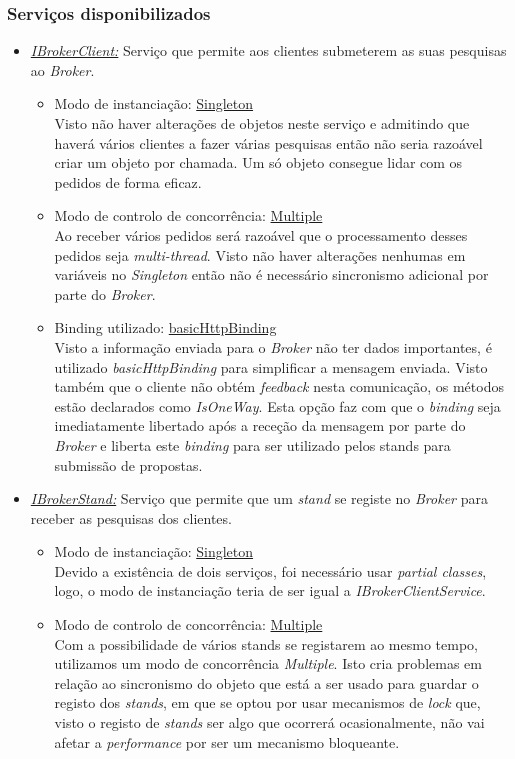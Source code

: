 \documentclass[a4paper]{article}
\begin{document}
\subsubsection{Serviços disponibilizados}
\begin{itemize} 

\item
\emph{\underline{IBrokerClient:}}
Serviço que permite aos clientes submeterem as suas pesquisas ao \emph{Broker}.
	\begin{itemize}
		\item
		Modo de instanciação: \underline{Singleton}\\
		Visto não haver alterações de objetos neste serviço e admitindo que haverá vários clientes a fazer várias pesquisas então não seria razoável criar um objeto por chamada. Um só objeto consegue lidar com os pedidos de forma eficaz.
		\item
		Modo de controlo de concorrência: \underline{Multiple}\\
		Ao receber vários pedidos será razoável que o processamento desses pedidos seja \emph{multi-thread}. Visto não haver alterações nenhumas em variáveis no \emph{Singleton} então não é necessário sincronismo adicional por parte do \emph{Broker}.
		\item
		Binding utilizado: \underline{basicHttpBinding}\\
		Visto a informação enviada para o \emph{Broker} não ter dados importantes, é utilizado \emph{basicHttpBinding} para simplificar a mensagem enviada. Visto também que o cliente não obtém \emph{feedback} nesta comunicação, os métodos estão declarados como \emph{IsOneWay}. Esta opção faz com que o \emph{binding} seja imediatamente libertado após a receção da mensagem por parte do \emph{Broker} e liberta este \emph{binding} para ser utilizado pelos stands para submissão de propostas.
	\end{itemize}
\item
\emph{\underline{IBrokerStand:}}
Serviço que permite que um \emph{stand} se registe no \emph{Broker} para receber as pesquisas dos clientes.
		\begin{itemize}
		\item
		Modo de instanciação: \underline{Singleton}\\
		Devido a existência de dois serviços, foi necessário usar \emph{partial classes}, logo, o modo de instanciação teria de ser igual a \emph{IBrokerClientService}.
		\item
		Modo de controlo de concorrência: \underline{Multiple}\\
		Com a possibilidade de vários stands se registarem ao mesmo tempo, utilizamos um modo de concorrência \emph{Multiple}. Isto cria problemas em relação ao sincronismo do objeto que está a ser usado para guardar o registo dos \emph{stands}, em que se optou por usar mecanismos de \emph{lock} que, visto o registo de \emph{stands} ser algo que ocorrerá ocasionalmente, não vai afetar a \emph{performance} por ser um mecanismo bloqueante.
		

\end{itemize}
\end{itemize}
\end{document}
